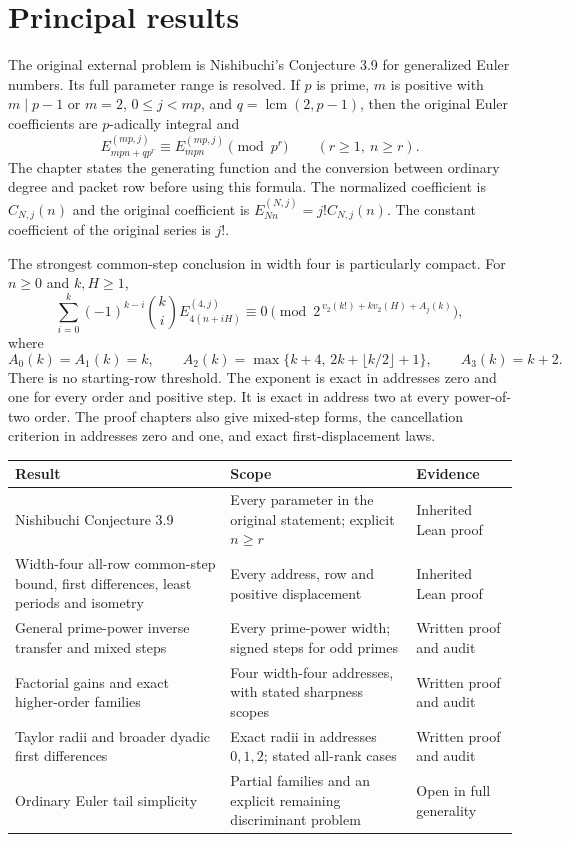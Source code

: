\section*{Principal results}
The original external problem is Nishibuchi's Conjecture 3.9 for generalized Euler numbers. Its full parameter range is resolved. If $p$ is prime, $m$ is positive with $m\mid p-1$ or $m=2$, $0\le j<mp$, and $q=\operatorname{lcm}(2,p-1)$, then the original Euler coefficients are $p$-adically integral and
\[
 E_{mpn+qp^r}^{(mp,j)}\equiv E_{mpn}^{(mp,j)}\pmod{p^r}
 \qquad (r\ge1,\ n\ge r).
\]
The chapter states the generating function and the conversion between ordinary degree and packet row before using this formula. The normalized coefficient is $C_{N,j}(n)$ and the original coefficient is $E_{Nn}^{(N,j)}=j!C_{N,j}(n)$. The constant coefficient of the original series is $j!$.

The strongest common-step conclusion in width four is particularly compact. For $n\ge0$ and $k,H\ge1$,
\begin{equation*}
 \sum_{i=0}^k(-1)^{k-i}\binom ki E_{4(n+iH)}^{(4,j)}
 \equiv0\pmod{2^{\,v_2(k!)+kv_2(H)+A_j(k)}},
\end{equation*}
where
\[
 A_0(k)=A_1(k)=k,\qquad
 A_2(k)=\max\{k+4,\,2k+\lfloor k/2\rfloor+1\},\qquad
 A_3(k)=k+2.
\]
There is no starting-row threshold. The exponent is exact in addresses zero and one for every order and positive step. It is exact in address two at every power-of-two order. The proof chapters also give mixed-step forms, the cancellation criterion in addresses zero and one, and exact first-displacement laws.

\begin{center}
\small
\begin{tabularx}{\linewidth}{@{}>{\raggedright\arraybackslash}p{.29\linewidth}>{\raggedright\arraybackslash}X>{\raggedright\arraybackslash}p{.21\linewidth}@{}}
\toprule
Result & Scope & Evidence\\
\midrule
Nishibuchi Conjecture 3.9 & Every parameter in the original statement; explicit $n\ge r$ & Inherited Lean proof\\
Width-four all-row common-step bound, first differences, least periods and isometry & Every address, row and positive displacement & Inherited Lean proof\\
General prime-power inverse transfer and mixed steps & Every prime-power width; signed steps for odd primes & Written proof and audit\\
Factorial gains and exact higher-order families & Four width-four addresses, with stated sharpness scopes & Written proof and audit\\
Taylor radii and broader dyadic first differences & Exact radii in addresses $0,1,2$; stated all-rank cases & Written proof and audit\\
Ordinary Euler tail simplicity & Partial families and an explicit remaining discriminant problem & Open in full generality\\
\bottomrule
\end{tabularx}
\end{center}

